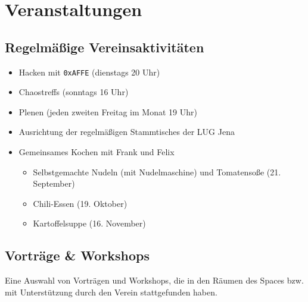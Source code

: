 \documentclass[10pt,DIV16]{scrartcl}
\begin{document}
\section{Veranstaltungen}

\subsection{Regelmäßige Vereinsaktivitäten}

\begin{itemize}
	\item Hacken mit \texttt{0xAFFE} (dienstags 20 Uhr)
	\item Chaostreffs (sonntags 16 Uhr)
	\item Plenen (jeden zweiten Freitag im Monat 19 Uhr)
	\item Ausrichtung der regelmäßigen Stammtisches der LUG Jena
	\item Gemeinsames Kochen mit Frank und Felix
		\begin{itemize}
			\item Selbstgemachte Nudeln (mit Nudelmaschine) und
				Tomatensoße (21. September)
			\item Chili-Essen (19. Oktober)
			\item Kartoffelsuppe (16. November)
		\end{itemize}
\end{itemize}

\subsection{Vorträge \& Workshops}

Eine Auswahl von Vorträgen und Workshops, die in den Räumen des
Spaces bzw. mit Unterstützung durch den Verein stattgefunden haben.
\end{document}
